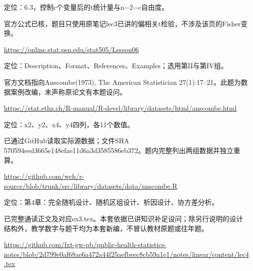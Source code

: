 \par\noindent\begin{minipage}{\linewidth}\label{src:PSU-PCOR}
\par
定位：6.3，控制c个变量后的t统计量与n−2−c自由度。\par
官方公式已核，题目只使用原笔记lec3已讲的偏相关t检验，不涉及该页的Fisher变换。\par
{\small\url{https://online.stat.psu.edu/stat505/Lesson06}}\par
\end{minipage}\par\medskip

\par\noindent\begin{minipage}{\linewidth}\label{src:R-ANSCOMBE}
\par
定位：Description、Format、References、Examples；选用第II与第IV组。\par
官方文档指向Anscombe(1973), The American Statistician 27(1):17–21。此题为数据案例改编，未声称原论文有本题设问。\par
{\small\url{https://stat.ethz.ch/R-manual/R-devel/library/datasets/html/anscombe.html}}\par
\end{minipage}\par\medskip

\par\noindent\begin{minipage}{\linewidth}\label{src:R-ANSCOMBE-DATA}
\par
定位：x2、y2、x4、y4四列，各11个数值。\par
已通过GitHub读取实际源数据；文件SHA 570594eed3665e148efae11d6a3d3585586eb372。题内完整列出两组数据并独立重算。\par
{\small\url{https://github.com/wch/r-source/blob/trunk/src/library/datasets/data/anscombe.R}}\par
\end{minipage}\par\medskip

\par\noindent\begin{minipage}{\linewidth}\label{src:L4}
\par
定位：第4章：完全随机设计、随机区组设计、析因设计、协方差分析。\par
已完整通读正文及对应ex3.tex。本套依据已讲知识补足设问；除另行说明的设计结构外，教学数字与题干均为本套新编，不冒认教材原题或往年题。\par
{\small\url{https://github.com/fxt-gw-pb/public-health-statistics-notes/blob/2d799e0af68ae6a472a44f25aefbeec8cb59a1e1/notes/linear/content/lec4.tex}}\par
\end{minipage}\par\medskip

